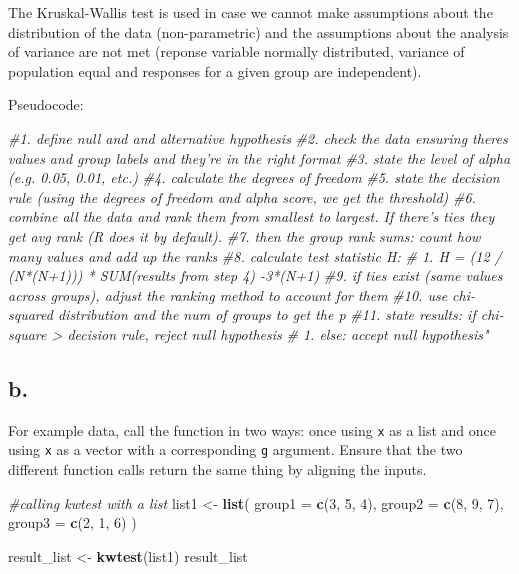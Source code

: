 \documentclass[
]{article}
\newenvironment{Shaded}{\begin{snugshade}}{\end{snugshade}}
\newcommand{\AttributeTok}[1]{\textcolor[rgb]{0.13,0.29,0.53}{#1}}
\newcommand{\CommentTok}[1]{\textcolor[rgb]{0.56,0.35,0.01}{\textit{#1}}}
\newcommand{\DecValTok}[1]{\textcolor[rgb]{0.00,0.00,0.81}{#1}}
\newcommand{\FunctionTok}[1]{\textcolor[rgb]{0.13,0.29,0.53}{\textbf{#1}}}
\newcommand{\NormalTok}[1]{#1}
\newcommand{\OtherTok}[1]{\textcolor[rgb]{0.56,0.35,0.01}{#1}}
\begin{document}
The Kruskal-Wallis test is used in case we cannot make assumptions about
the distribution of the data (non-parametric) and the assumptions about
the analysis of variance are not met (reponse variable normally
distributed, variance of population equal and responses for a given
group are independent).

Pseudocode:

\begin{Shaded}
\begin{Highlighting}[]
\CommentTok{\#1. define null and and alternative hypothesis}
\CommentTok{\#2. check the data ensuring theres values and group labels and they’re in the right format}
\CommentTok{\#3. state the level of alpha (e.g. 0.05, 0.01, etc.)}
\CommentTok{\#4. calculate the degrees of freedom}
\CommentTok{\#5. state the decision rule (using the degrees of freedom and alpha score, we get the threshold)}
\CommentTok{\#6. combine all the data and rank them from smallest to largest. If there’s ties they get avg rank (R does it by default).}
\CommentTok{\#7. then the group rank sums: count how many values and add up the ranks}
\CommentTok{\#8. calculate test statistic H:}
\CommentTok{\#   1.  H = (12 / (N*(N+1))) * SUM(results from step 4) {-}3*(N+1)}
\CommentTok{\#9. if ties exist (same values across groups), adjust the ranking method to account for them}
\CommentTok{\#10. use chi{-}squared distribution and the num of groups to get the p}
\CommentTok{\#11. state results: if chi{-}square \textgreater{} decision rule, reject null hypothesis}
\CommentTok{\#   1. else: accept null hypothesis"}
\end{Highlighting}
\end{Shaded}

\subsection{b.}\label{b.-5}

For example data, call the function in two ways: once using \texttt{x}
as a list and once using \texttt{x} as a vector with a corresponding
\texttt{g} argument. Ensure that the two different function calls return
the same thing by aligning the inputs.

\begin{Shaded}
\begin{Highlighting}[]
\CommentTok{\#calling kwtest with a list}
\NormalTok{list1 }\OtherTok{\textless{}{-}} \FunctionTok{list}\NormalTok{(}
  \AttributeTok{group1 =} \FunctionTok{c}\NormalTok{(}\DecValTok{3}\NormalTok{, }\DecValTok{5}\NormalTok{, }\DecValTok{4}\NormalTok{),}
  \AttributeTok{group2 =} \FunctionTok{c}\NormalTok{(}\DecValTok{8}\NormalTok{, }\DecValTok{9}\NormalTok{, }\DecValTok{7}\NormalTok{),}
  \AttributeTok{group3 =} \FunctionTok{c}\NormalTok{(}\DecValTok{2}\NormalTok{, }\DecValTok{1}\NormalTok{, }\DecValTok{6}\NormalTok{)}
\NormalTok{)}

\NormalTok{result\_list }\OtherTok{\textless{}{-}} \FunctionTok{kwtest}\NormalTok{(list1)}
\NormalTok{result\_list}
\end{Highlighting}
\end{Shaded}
\end{document}
